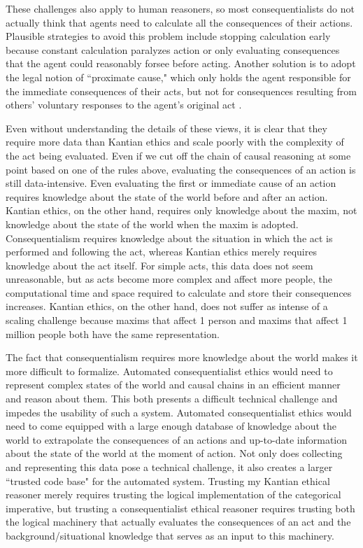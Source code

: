 \begin{isabellebody}
\begin{isamarkuptext}
These challenges also apply to human reasoners, so most consequentialists do not actually think that 
agents need to calculate all the consequences of their actions. Plausible strategies to avoid this problem
include stopping calculation early because constant calculation paralyzes action or only evaluating 
consequences that the agent could reasonably forsee before acting. Another solution is to adopt the legal notion 
of ``proximate cause," which only holds the agent responsible for the immediate consequences of their 
acts, but not for consequences resulting from others' voluntary responses to the agent's original act \cite{consequentialismsep}.

Even without understanding the details of these views, it is clear that they require 
more data than Kantian ethics and scale poorly with the complexity of the act being evaluated. Even 
if we cut off the chain of causal reasoning at some point based on 
one of the rules above, evaluating the consequences of an action is still data-intensive. Even evaluating
the first or immediate cause of an action requires knowledge about the state of the world before
and after an action. Kantian ethics, on the other hand, requires only knowledge about the maxim, not 
knowledge about the state of the world when the maxim is adopted. Consequentialism requires knowledge about 
the situation in which the act is performed and following the act, whereas Kantian ethics merely requires 
knowledge about the act itself. For simple acts, this data does not seem unreasonable, but as acts become
more complex and affect more people, the computational time and space required to calculate and store
their consequences increases. Kantian ethics, on the other hand, does not suffer as intense of a scaling
challenge because maxims that affect 1 person and maxims that affect 1 million people both have the same
representation.

The fact that consequentialism requires more knowledge about the world makes it more difficult to formalize.
Automated consequentialist ethics would need to represent complex states of the world and causal chains
in an efficient manner and reason about them. This both presents a difficult technical challenge and
impedes the usability of such a system. Automated consequentialist ethics would need to come equipped with 
a large enough database of knowledge about the world to extrapolate the consequences of an actions and
up-to-date information about the state of the world at the moment of action. Not only does collecting 
and representing this data pose a technical challenge, it also creates a larger ``trusted code base" for 
the automated system. Trusting my Kantian ethical reasoner merely requires trusting the logical implementation
of the categorical imperative, but trusting a consequentialist ethical reasoner requires trusting both the
logical machinery that actually evaluates the consequences of an act and the background/situational
knowledge that serves as an input to this machinery.


\end{isamarkuptext}
\end{isabellebody}

